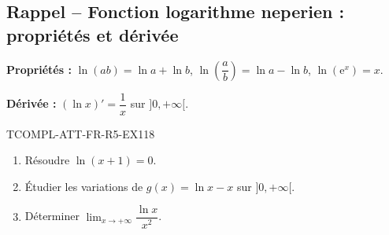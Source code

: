 

\subsection*{Rappel -- Fonction logarithme neperien : propriétés et dérivée}

\textbf{Propriétés :} $\ln(ab) = \ln a + \ln b$, $\ln\left(\dfrac{a}{b}\right) = \ln a - \ln b$, $\ln(\mathrm{e}^x) = x$.

\textbf{Dérivée :} $(\ln x)' = \dfrac{1}{x}$ sur $]0, +\infty[$.

\begin{exercice}{TCOMPL-ATT-FR-R5-EX1}{1}{8}
\begin{enumerate}
  \item Résoudre $\ln(x + 1) = 0$.
  \item Étudier les variations de $g(x) = \ln x - x$ sur $]0, +\infty[$.
  \item Déterminer $\lim_{x \to +\infty} \dfrac{\ln x}{x^2}$.
\end{enumerate}
\end{exercice}


